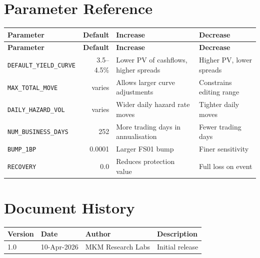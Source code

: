\documentclass[11pt,a4paper]{article}
\begin{document}
\section{Parameter Reference}
\label{ch:reference}

\begin{longtable}{p{4.5cm}rp{3.5cm}p{3.5cm}}
\toprule
\textbf{Parameter} & \textbf{Default} & \textbf{Increase} & \textbf{Decrease} \\
\midrule
\endfirsthead
\toprule
\textbf{Parameter} & \textbf{Default} & \textbf{Increase} & \textbf{Decrease} \\
\midrule
\endhead
\texttt{DEFAULT\_YIELD\_CURVE} & 3.5--4.5\% &
  Lower PV of cashflows, higher spreads &
  Higher PV, lower spreads \\[4pt]
\texttt{MAX\_TOTAL\_MOVE} & varies &
  Allows larger curve adjustments &
  Constrains editing range \\[4pt]
\texttt{DAILY\_HAZARD\_VOL} & varies &
  Wider daily hazard rate moves &
  Tighter daily moves \\[4pt]
\texttt{NUM\_BUSINESS\_DAYS} & 252 &
  More trading days in annualisation &
  Fewer trading days \\[4pt]
\texttt{BUMP\_1BP} & 0.0001 &
  Larger FS01 bump &
  Finer sensitivity \\[4pt]
\texttt{RECOVERY} & 0.0 &
  Reduces protection value &
  Full loss on event \\
\bottomrule
\end{longtable}


\section*{Document History}

\begin{tabular}{llll}
\toprule
\textbf{Version} & \textbf{Date} & \textbf{Author} & \textbf{Description} \\
\midrule
1.0 & 10-Apr-2026 & MKM Research Labs & Initial release \\
\bottomrule
\end{tabular}
\end{document}
